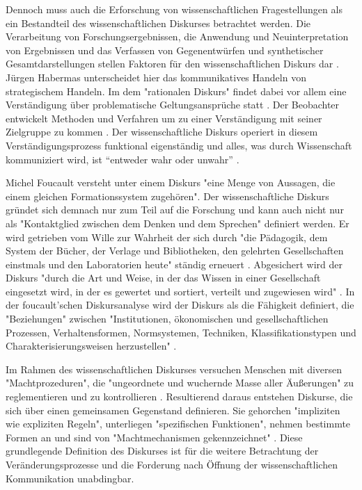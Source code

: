 Dennoch muss auch die Erforschung von wissenschaftlichen Fragestellungen als ein Bestandteil des wissenschaftlichen Diskurses \cite{suchen} betrachtet werden. Die Verarbeitung von Forschungsergebnissen, die Anwendung und Neuinterpretation von Ergebnissen und das Verfassen von Gegenentwürfen und synthetischer Gesamtdarstellungen stellen Faktoren für den wissenschaftlichen Diskurs dar \cite{suchen}. Jürgen Habermas unterscheidet hier das kommunikatives Handeln von strategischem Handeln. Im dem "rationalen Diskurs" findet dabei vor allem eine Verständigung über problematische Geltungsansprüche statt \cite{suchen}. Der Beobachter entwickelt Methoden und Verfahren um zu einer Verständigung mit seiner Zielgruppe zu kommen \cite{suchen}. Der wissenschaftliche Diskurs operiert in diesem Verständigungsprozess funktional eigenständig und alles, was durch Wissenschaft kommuniziert wird, ist “entweder wahr oder unwahr” \cite{Luhmann1998}.

Michel Foucault versteht unter einem Diskurs "eine Menge von Aussagen, die einem gleichen Formationssystem zugehören"\cite{foucault_archaologie_1981}. Der wissenschaftliche Diskurs gründet sich demnach nur zum Teil auf die Forschung und kann auch nicht nur als "Kontaktglied zwischen dem Denken und dem Sprechen" \cite{foucault_ordnung_2003} definiert werden. Er wird getrieben vom Wille zur Wahrheit der sich durch "die Pädagogik, dem System der Bücher, der Verlage und Bibliotheken, den gelehrten Gesellschaften einstmals und den Laboratorien heute" ständig erneuert \cite{foucault_ordnung_2003}. Abgesichert wird der Diskurs "durch die Art und Weise, in der das Wissen in einer Gesellschaft eingesetzt wird, in der es gewertet und sortiert, verteilt und zugewiesen wird" \cite{foucault_ordnung_2003}. In der foucault'schen Diskursanalyse wird der Diskurs als die Fähigkeit definiert, die "Beziehungen" zwischen "Institutionen, ökonomischen und gesellschaftlichen Prozessen, Verhaltensformen, Normsystemen, Techniken, Klassifikationstypen und Charakterisierungsweisen herzustellen" \cite{foucault_archaologie_1981}.

Im Rahmen des wissenschaftlichen Diskurses versuchen Menschen mit diversen "Machtprozeduren", die "ungeordnete und wuchernde Masse aller Äußerungen" zu reglementieren und zu kontrollieren \cite{Neymeyer_diskurs_2010}. Resultierend daraus entstehen Diskurse, die sich über einen gemeinsamen Gegenstand definieren. Sie gehorchen "impliziten wie expliziten Regeln", unterliegen "spezifischen Funktionen", nehmen bestimmte Formen an und sind von "Machtmechanismen gekennzeichnet" \cite{Neymeyer_diskurs_2010}. Diese grundlegende Definition des Diskurses ist für die weitere Betrachtung der Veränderungsprozesse und die Forderung nach Öffnung der wissenschaftlichen Kommunikation unabdingbar.


